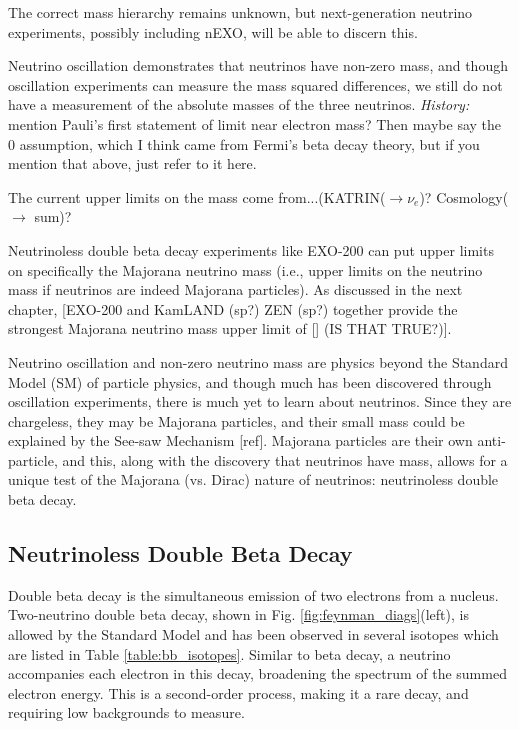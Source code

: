 \noindent
The correct mass hierarchy remains unknown, but next-generation neutrino experiments, possibly including nEXO, will be able to discern this.

Neutrino oscillation demonstrates that neutrinos have non-zero mass, and though oscillation experiments can measure the mass squared differences, we still do not have a measurement of the absolute masses of the three neutrinos.  {\color{gray}\emph{History:  }mention Pauli's first statement of limit near electron mass?  Then maybe say the 0 assumption, which I think came from Fermi's beta decay theory, but if you mention that above, just refer to it here.}

The current upper limits on the mass come from...(KATRIN($\rightarrow \nu_{e}$)?  Cosmology($\rightarrow$ sum)?

Neutrinoless double beta decay experiments like EXO-200 can put upper limits on specifically the Majorana neutrino mass (i.e., upper limits on the neutrino mass if neutrinos are indeed Majorana particles).  As discussed in the next chapter, [EXO-200 and KamLAND (sp?) ZEN (sp?) together provide the strongest Majorana neutrino mass upper limit of [] (IS THAT TRUE?)].

Neutrino oscillation and non-zero neutrino mass are physics beyond the Standard Model (SM) of particle physics, and though much has been discovered through oscillation experiments, there is much yet to learn about neutrinos. Since they are chargeless, they may be Majorana particles, and their small mass could be explained by the See-saw Mechanism [ref]. Majorana particles are their own anti-particle, and this, along with the discovery that neutrinos have mass, allows for a unique test of the Majorana (vs. Dirac) nature of neutrinos: neutrinoless double beta decay.

\subsection{Neutrinoless Double Beta Decay}

Double beta decay is the simultaneous emission of two electrons from a nucleus.  Two-neutrino double beta decay, shown in Fig. \ref{fig:feynman_diags}(left), is allowed by the Standard Model and has been observed in several isotopes which are listed in Table \ref{table:bb_isotopes}.  Similar to beta decay, a neutrino accompanies each electron in this decay, broadening the spectrum of the summed electron energy. This is a second-order process, making it a rare decay, and requiring low backgrounds to measure.

